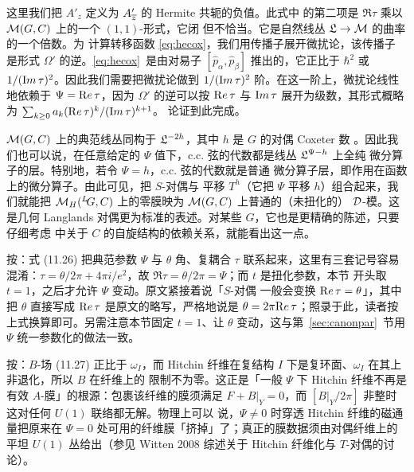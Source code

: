 这里我们把 $A'_z$ 定义为 $A'_\bz$ 的 Hermite 共轭的负值。此式中
的第二项是 $\Re\tau$ 乘以 $\M(G,C)$ 上的一个 $(1,1)$-形式，它闭
但不恰当。它是自然线丛 ${\frak L}\to\M$ 的曲率的一个倍数。为
计算转移函数 \eqref{eq:hecox}，我们用传播子展开微扰论，该传播子
是形式 $\Omega'$ 的逆。\eqref{eq:hecox}\ 是由对易子
$[\hat p_\alpha,\hat p_\beta]$ 推出的，它正比于 $\hbar^2$ 或
${1/ ({\rm Im}\,\tau)^2}$。因此我们需要把微扰论做到
$1/({\rm Im}\,\tau)^2$ 阶。在这一阶上，微扰论线性地依赖于
$\Psi={\rm Re}\,\tau$，因为 $\Omega'$ 的逆可以按
${\rm Re}\,\tau$ 与 ${\rm Im}\,\tau$ 展开为级数，其形式概略为
$\sum_{k\geq 0}a_k({\rm Re}\,\tau)^k/({\rm Im}\,\tau)^{k+1}$。
论证到此完成。

$\cM(G,C)$ 上的典范线丛同构于 ${\frak L}^{-2h}$，其中 $h$ 是 $G$
的对偶 Coxeter 数 \cite{ref141}。因此我们也可以说，在任意给定的
$\Psi$ 值下，c.c. 弦的代数都是线丛 ${\frak L}^{\Psi-h}$ 上全纯
微分算子的层。特别地，若令 $\Psi=h$，c.c. 弦的代数就是普通
微分算子层，即作用在函数上的微分算子。由此可见，把 $S$-对偶与
平移 $T^h$（它把 $\Psi$ 平移 $h$）组合起来，我们就能把
$\MH(\LG,C)$ 上的零膜映为 $\cM(G,C)$ 上普通的（未扭化的）
${\cal D}$-模。这是几何 Langlands 对偶更为标准的表述。对某些
$G$，它也是更精确的陈述，只要仔细考虑 \cite{ref5,ref26} 中关于
$C$ 的自旋结构的依赖关系，就能看出这一点。

\begin{yizhu}[易错点]
按：式 (11.26) 把典范参数 $\Psi$ 与 $\theta$ 角、复耦合 $\tau$
联系起来，这里有三套记号容易混淆：$\tau=\theta/2\pi+4\pi
i/e^2$，故 $\Re\tau=\theta/2\pi=\Psi$；而 $t$ 是扭化参数，本节
开头取 $t=1$，之后才允许 $\Psi$ 变动。原文紧接着说「$S$-对偶
一般会变换 ${\rm Re}\,\tau=\theta$」，其中把 $\theta$ 直接写成
${\rm Re}\,\tau$ 是原文的略写，严格地说是 $\theta=2\pi{\rm
Re}\,\tau$；照录于此，读者按上式换算即可。另需注意本节固定
$t=1$、让 $\theta$ 变动，这与第~\ref{sec:canonpar}~节用 $\Psi$
统一参数化的做法一致。
\end{yizhu}

\begin{yizhu}[物理图像]
按：$B$-场 (11.27) 正比于 $\omega_I$，而 Hitchin 纤维在复结构
$I$ 下是复环面、$\omega_I$ 在其上非退化，所以 $B$ 在纤维上的
限制不为零。这正是「一般 $\Psi$ 下 Hitchin 纤维不再是有效
$A$-膜」的根源：包裹该纤维的膜须满足 $F+B|_Y=0$，而
$[B|_Y/2\pi]$ 非整时这对任何 $U(1)$ 联络都无解。物理上可以
说，$\Psi\neq 0$ 时穿透 Hitchin 纤维的磁通量把原来在 $\Psi=0$
处可用的纤维膜「挤掉」了；真正的膜数据须由对偶纤维上的平坦
$U(1)$ 丛给出（参见 Witten 2008 综述关于 Hitchin 纤维化与
$T$-对偶的讨论）。
\end{yizhu}

